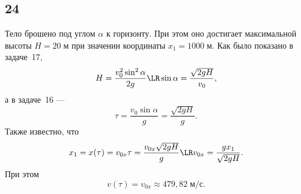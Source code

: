 \subsection{24}

Тело брошено под углом $\alpha$ к горизонту. При этом оно достигает максимальной высоты $H=20\;\text{м}$ при значении координаты $x_1=1000\;\text{м}$. Как было показано в задаче~17,
\[
H=\frac{v_0^2\sin^2\alpha}{2g}\LR\sin\alpha=\frac{\sqrt{2gH}}{v_0},
\]
а в задаче~16 ---
\[
\tau=\frac{v_0\sin\alpha}{g}=\frac{\sqrt{2gH}}{g}.
\]
Также известно, что
\[
x_1=x(\tau)=v_{0x}\tau=\frac{v_{0x}\sqrt{2gH}}{g}\LR v_{0x}=\frac{gx_1}{\sqrt{2gH}}.
\]
При этом
\[
v(\tau)=v_{0x}\approx479{,}82\;\text{м/с}.
\]